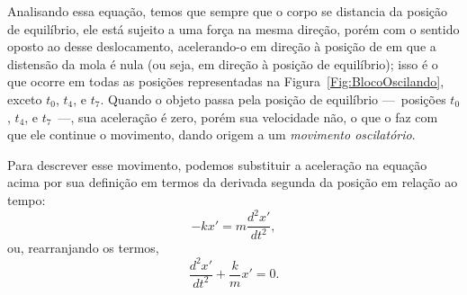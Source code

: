 Analisando essa equação, temos que sempre que o corpo se distancia da posição de equilíbrio, ele está sujeito a uma força na mesma direção, porém com o sentido oposto ao desse deslocamento, acelerando-o em direção à posição de em que a distensão da mola é nula (ou seja, em direção à posição de equilíbrio); isso é o que ocorre em todas as posições representadas na Figura~\ref{Fig:BlocoOscilando}, exceto $t_0$, $t_4$, e $t_7$. Quando o objeto passa pela posição de equilíbrio ---~posições $t_0$, $t_4$, e $t_7$~---, sua aceleração é zero, porém sua velocidade não, o que o faz com que ele continue o movimento, dando origem a um \emph{movimento oscilatório}.

Para descrever esse movimento, podemos substituir a aceleração na equação acima por sua definição em termos da derivada segunda da posição em relação ao tempo:
\begin{equation}
	-kx' = m\frac{d^2x'}{dt^2},
\end{equation}
%
ou, rearranjando os termos,
\begin{equation}\label{Eq:EquacaoDiferencialOHS}
	\frac{d^2x'}{dt^2} + \frac{k}{m} x' = 0.
\end{equation}

